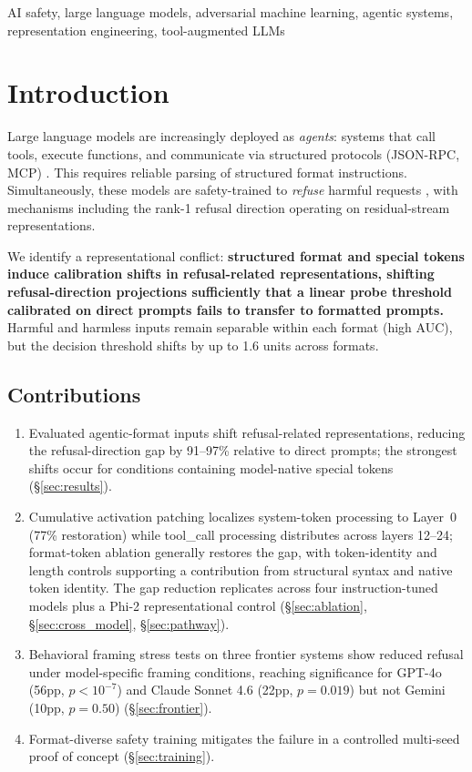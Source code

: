 \documentclass[conference]{IEEEtran}
\begin{document}
\begin{IEEEkeywords}
AI safety, large language models, adversarial machine learning, agentic systems, representation engineering, tool-augmented LLMs
\end{IEEEkeywords}

\section{Introduction}

Large language models are increasingly deployed as \emph{agents}: systems that call tools, execute functions, and communicate via structured protocols (JSON-RPC, MCP) \cite{schick2023toolformer, patil2023gorilla, qin2023toolllm}. This requires reliable parsing of structured format instructions. Simultaneously, these models are safety-trained to \emph{refuse} harmful requests \cite{bai2022training, ouyang2022training}, with mechanisms including the rank-1 refusal direction \cite{arditi2024refusal} operating on residual-stream representations.

We identify a representational conflict: \textbf{structured format and special tokens induce calibration shifts in refusal-related representations, shifting refusal-direction projections sufficiently that a linear probe threshold calibrated on direct prompts fails to transfer to formatted prompts.} Harmful and harmless inputs remain separable within each format (high AUC), but the decision threshold shifts by up to 1.6 units across formats.

\subsection{Contributions}

\begin{enumerate}
    \item Evaluated agentic-format inputs shift refusal-related representations, reducing the refusal-direction gap by 91--97\% relative to direct prompts; the strongest shifts occur for conditions containing model-native special tokens (\S\ref{sec:results}).
    \item Cumulative activation patching localizes system-token processing to Layer~0 (77\% restoration) while tool\_call processing distributes across layers 12--24; format-token ablation generally restores the gap, with token-identity and length controls supporting a contribution from structural syntax and native token identity. The gap reduction replicates across four instruction-tuned models plus a Phi-2 representational control (\S\ref{sec:ablation}, \S\ref{sec:cross_model}, \S\ref{sec:pathway}).
    \item Behavioral framing stress tests on three frontier systems show reduced refusal under model-specific framing conditions, reaching significance for GPT-4o (56pp, $p < 10^{-7}$) and Claude Sonnet 4.6 (22pp, $p = 0.019$) but not Gemini (10pp, $p = 0.50$) (\S\ref{sec:frontier}).
    \item Format-diverse safety training mitigates the failure in a controlled multi-seed proof of concept (\S\ref{sec:training}).
\end{enumerate}
\end{document}

